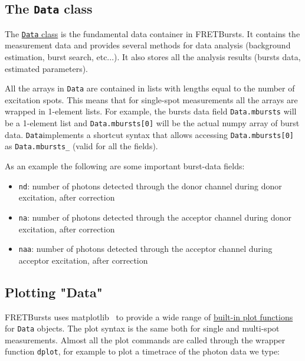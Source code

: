 \subsection{The \texttt{Data} class}
\label{sec:data_intro}

The
\href{http://fretbursts.readthedocs.org/en/latest/data_class.html}{\texttt{Data}
class} is the fundamental data container in FRETBursts. It contains the
measurement data and provides several methods for data analysis (background
estimation, burst search, etc...). It also stores all the analysis results
(bursts data, estimated parameters).

All the arrays in \texttt{Data} are contained in lists with lengths equal to the
number of excitation spots. This means that for single-spot measurements all the
arrays are wrapped in 1-element lists. For example, the bursts data field
\verb|Data.mbursts| will be a 1-element list and \verb|Data.mbursts[0]| will be
the actual numpy array of burst data. \verb|Data|implements a shortcut syntax
that allows accessing 
\verb|Data.mbursts[0]| as \verb|Data.mbursts_| (valid for all the fields).

As an example the following are some important burst-data fields:

\begin{itemize}
\item \verb|nd|: number of photons detected through the donor channel during
donor excitation, after correction
\item \verb|na|: number of photons detected through the acceptor channel during
donor excitation, after correction
\item \verb|naa|: number of photons detected through the acceptor channel during
acceptor excitation, after correction
\end{itemize}

\subsection{Plotting "Data"}

FRETBursts uses matplotlib~\cite{2096e2a4-8f50-4519-bfb3-f796da201630} to
provide a wide range of 
\href{http://fretbursts.readthedocs.org/en/latest/plots.html}{built-in plot functions}
for \verb|Data| objects. 
The plot syntax is the same both for single and multi-spot measurements. 
Almost all the plot commands are called through the wrapper function 
\verb|dplot|, for example to plot a timetrace of the photon data we type:

